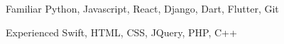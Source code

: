 

\begin{cvskills}

  \cvskill
    {Familiar} %
    {Python, Javascript, React, Django, Dart, Flutter, Git} %

  \cvskill
    {Experienced} %
    {Swift, HTML, CSS, JQuery, PHP, C++} %

\end{cvskills}
